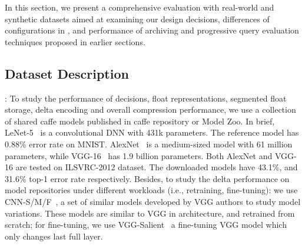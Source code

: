 \documentclass[conference]{IEEEtran}
\begin{document}
In this section, we present a comprehensive evaluation with real-world and
synthetic datasets aimed at examining our design decisions, differences of
configurations in \weightstore, and performance of archiving and progressive
query evaluation techniques proposed in earlier sections. 

\subsection{Dataset Description}
: 
To study the performance of \weightstore\design decisions, float
representations, segmented float storage, delta encoding and overall
compression performance, we use a collection of shared caffe models %
published in caffe repository or Model Zoo. In brief,
LeNet-5~\cite{lenet90} is a convolutional DNN with 431k parameters. The reference model has
0.88\% error rate on MNIST. AlexNet~\cite{alexnet2012imagenet} is a medium-sized model with 61 million
parameters, while VGG-16~\cite{vgg14} has 1.9 billion parameters. Both AlexNet and VGG-16
are tested on ILSVRC-2012 dataset. The downloaded models have 43.1\%, and
31.6\% top-1 error rate respectively. %
Besides, to study the delta performance on model repositories under different workloads (i.e., retraining, fine-tuning): we use CNN-S/M/F~\cite{vggsmfbmvc14}, a set of similar models developed by VGG authors to study model variations. These models are similar to VGG in architecture, and retrained from scratch; for fine-tuning, we use VGG-Salient~\cite{zhang2015salient} a fine-tuning VGG model which only changes last full layer. 

\end{document}
